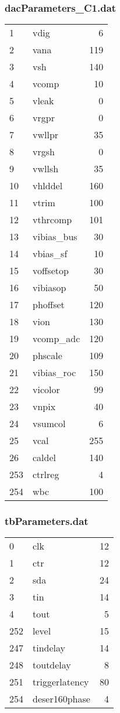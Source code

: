 \documentclass[british,11pt,a4paper]{memoir}
\begin{document}
\subsubsection{dacParameters\_C1.dat}
\ubuntu
\begin{tabular}{llr}
\hline
1	&	vdig	&	6	\\
2	&	vana	&	119	\\
3	&	vsh	&	140	\\
4	&	vcomp	&	10	\\
5	&	vleak	&	0	\\
6	&	vrgpr	&	0	\\
7	&	vwllpr	&	35	\\
8	&	vrgsh	&	0	\\
9	&	vwllsh	&	35	\\
10	&	vhlddel	&	160	\\
11	&	vtrim	&	100	\\
12	&	vthrcomp	&	101	\\
13	&	vibias\_bus	&	30	\\
14	&	vbias\_sf	&	10	\\
15	&	voffsetop	&	30	\\
16	&	vibiasop	&	50	\\
17	&	phoffset	&	120	\\
18	&	vion	&	130	\\
19	&	vcomp\_adc	&	120	\\
20	&	phscale	&	109	\\
21	&	vibias\_roc	&	150	\\
22	&	vicolor	&	99	\\
23	&	vnpix	&	40	\\
24	&	vsumcol	&	6	\\
25	&	vcal	&	255	\\
26	&	caldel	&	140	\\
253	&	ctrlreg	&	4	\\
254	&	wbc	&	100	\\\hline
\end{tabular}

\subsubsection{tbParameters.dat}
\ubuntu
\begin{tabular}{llr}
\hline
0	&	clk	&	12	\\
1	&	ctr	&	12	\\
2	&	sda	&	24	\\
3	&	tin	&	14	\\
4	&	tout	&	5	\\
252	&	level	&	15	\\
247	&	tindelay	&	14	\\
248	&	toutdelay	&	8	\\
251	&	triggerlatency	&	80	\\
254	&	deser160phase	&	4	\\\hline
\end{tabular}
\end{document}
